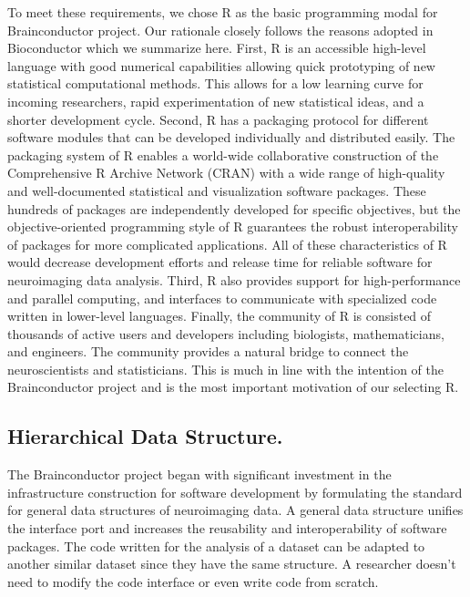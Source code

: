 \documentclass{nature}
\begin{document}
To meet these requirements, we chose R as the basic programming
modal for Brainconductor project. Our rationale closely follows
the reasons adopted in Bioconductor which we summarize
here\cite{gentleman2004bioconductor}.
First, R is an accessible high-level language with
good numerical capabilities allowing quick prototyping of new statistical
computational methods. This allows for a low learning curve for
incoming researchers, rapid experimentation of
new statistical ideas, and a shorter development cycle.
Second, R has a packaging protocol for different software
modules that can be developed individually and distributed easily. The
packaging system of R enables a world-wide collaborative construction of the
Comprehensive R Archive Network (CRAN) with a wide range of
high-quality and well-documented statistical and visualization software
packages. These hundreds of packages are independently developed for specific
objectives, but the objective-oriented programming style of R guarantees the
robust interoperability of packages for more complicated applications. All of
these characteristics of R would decrease development efforts and release time
for reliable software for neuroimaging data analysis.
Third, R also provides
support for high-performance\cite{buckner2010gputools} and parallel
computing\cite{schmidberger2009state},
and interfaces to communicate with specialized code
written in lower-level languages.
Finally, the community of R is
consisted of thousands of active users and developers including biologists,
mathematicians, and engineers. The community provides a natural bridge to
connect the neuroscientists and statisticians. This is much in line with the
intention of the Brainconductor project and is the most important motivation of
our
selecting R.


\subsection{Hierarchical Data Structure.} The Brainconductor
project began with significant investment in the infrastructure construction for
software development by formulating the standard for general data structures of
neuroimaging data. A general data structure unifies the interface port and
increases the reusability and interoperability of software packages. The code
written for the analysis of a dataset can be adapted to another similar dataset
since they have the same structure. A researcher doesn't need to modify the code
interface or even write code from scratch.
\end{document}
